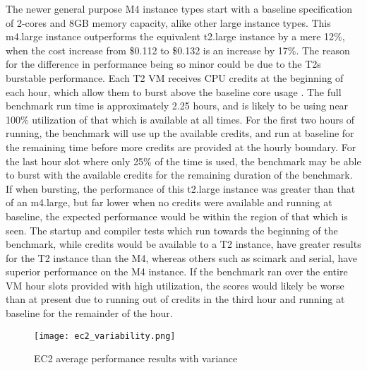 \documentclass[conference]{IEEEtran}
\begin{document}
The newer general purpose M4 instance types start with a baseline specification of 2-cores and 8GB memory capacity, alike other large instance types. This m4.large instance outperforms the equivalent t2.large instance by a mere 12\%, when the cost increase from \$0.112 to \$0.132 is an increase by 17\%. The reason for the difference in performance being so minor could be due to the T2s burstable performance. Each T2 VM receives CPU credits at the beginning of each hour, which allow them to burst above the baseline core usage \cite{awsvmtype}. The full benchmark run time is approximately 2.25 hours, and is likely to be using near 100\% utilization of that which is available at all times. For the first two hours of running, the benchmark will use up the available credits, and run at baseline for the remaining time before more credits are provided at the hourly boundary. For the last hour slot where only 25\% of the time is used, the benchmark may be able to burst with the available credits for the remaining duration of the benchmark. If when bursting, the performance of this t2.large instance was greater than that of an m4.large, but far lower when no credits were available and running at baseline, the expected performance would be within the region of that which is seen. The startup and compiler tests which run towards the beginning of the benchmark, while credits would be available to a T2 instance, have greater results for the T2 instance than the M4, whereas others such as scimark and serial, have superior performance on the M4 instance. If the benchmark ran over the entire VM hour slots provided with high utilization, the scores would likely be worse than at present due to running out of credits in the third hour and running at baseline for the remainder of the hour.


\begin{figure}[ht]
  \centering
  \texttt{[image: ec2\_variability.png]}
  \caption{EC2 average performance results with variance}
  \label{fig:ec2variability}
\end{figure}
\end{document}
